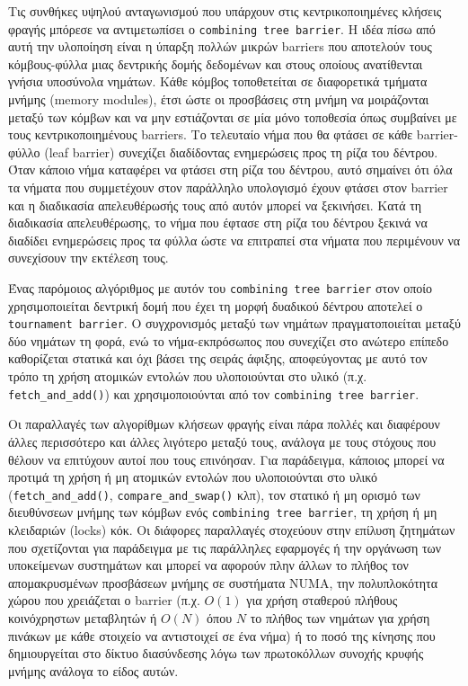 Τις συνθήκες υψηλού ανταγωνισμού που υπάρχουν στις κεντρικοποιημένες κλήσεις φραγής μπόρεσε να αντιμετωπίσει ο \texttt{combining tree barrier}. Η ιδέα πίσω από αυτή την υλοποίηση είναι η ύπαρξη πολλών μικρών barriers που αποτελούν τους κόμβους-φύλλα μιας δεντρικής δομής δεδομένων και στους οποίους ανατίθενται γνήσια υποσύνολα νημάτων. Κάθε κόμβος τοποθετείται σε διαφορετικά τμήματα μνήμης (memory modules), έτσι ώστε οι προσβάσεις στη μνήμη να μοιράζονται μεταξύ των κόμβων και να μην εστιάζονται σε μία μόνο τοποθεσία όπως συμβαίνει με τους κεντρικοποιημένους barriers. Το τελευταίο νήμα που θα φτάσει σε κάθε barrier-φύλλο (leaf barrier) συνεχίζει διαδίδοντας ενημερώσεις προς τη ρίζα του δέντρου. Όταν κάποιο νήμα καταφέρει να φτάσει στη ρίζα του δέντρου, αυτό σημαίνει ότι όλα τα νήματα που συμμετέχουν στον παράλληλο υπολογισμό έχουν φτάσει στον barrier και η διαδικασία απελευθέρωσής τους από αυτόν μπορεί να ξεκινήσει. Κατά τη διαδικασία απελευθέρωσης, το νήμα που έφτασε στη ρίζα του δέντρου ξεκινά να διαδίδει ενημερώσεις προς τα φύλλα ώστε να επιτραπεί στα νήματα που περιμένουν να συνεχίσουν την εκτέλεση τους.

Ένας παρόμοιος αλγόριθμος με αυτόν του \texttt{combining tree barrier} στον οποίο χρησιμοποιείται δεντρική δομή που έχει τη μορφή δυαδικού δέντρου αποτελεί ο \texttt{tournament barrier}. Ο συγχρονισμός μεταξύ των νημάτων πραγματοποιείται μεταξύ δύο νημάτων τη φορά, ενώ το νήμα-εκπρόσωπος που συνεχίζει στο ανώτερο επίπεδο καθορίζεται στατικά και όχι βάσει της σειράς άφιξης, αποφεύγοντας με αυτό τον τρόπο τη χρήση ατομικών εντολών που υλοποιούνται στο υλικό (π.χ. \texttt{fetch\_and\_add()}) και χρησιμοποιούνται από τον \texttt{combining tree barrier}.

Οι παραλλαγές των αλγορίθμων κλήσεων φραγής είναι πάρα πολλές και διαφέρουν άλλες περισσότερο και άλλες λιγότερο μεταξύ τους, ανάλογα με τους στόχους που θέλουν να επιτύχουν αυτοί που τους επινόησαν. Για παράδειγμα, κάποιος μπορεί να προτιμά τη χρήση ή μη ατομικών εντολών που υλοποιούνται στο υλικό (\texttt{fetch\_and\_add()}, \texttt{compare\_and\_swap()} κλπ), τον στατικό ή μη ορισμό των διευθύνσεων μνήμης των κόμβων ενός \texttt{combining tree barrier}, τη χρήση ή μη κλειδαριών (locks) κόκ. Οι διάφορες παραλλαγές στοχεύουν στην επίλυση ζητημάτων που σχετίζονται για παράδειγμα με τις παράλληλες εφαρμογές ή την οργάνωση των υποκείμενων συστημάτων και μπορεί να αφορούν πλην άλλων το πλήθος τον απομακρυσμένων προσβάσεων μνήμης σε συστήματα NUMA, την πολυπλοκότητα χώρου που χρειάζεται ο barrier (π.χ. $O(1)$ για χρήση σταθερού πλήθους κοινόχρηστων μεταβλητών ή $O(N)$ όπου $N$ το πλήθος των νημάτων για χρήση πινάκων με κάθε στοιχείο να αντιστοιχεί σε ένα νήμα) ή το ποσό της κίνησης που δημιουργείται στο δίκτυο διασύνδεσης λόγω των πρωτοκόλλων συνοχής κρυφής μνήμης ανάλογα το είδος αυτών.

